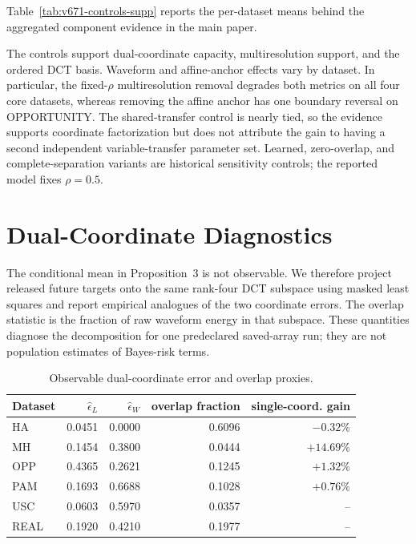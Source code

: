 \documentclass[letterpaper,10pt]{article}
\begin{document}
Table~\ref{tab:v671-controls-supp} reports the per-dataset means behind the
aggregated component evidence in the main paper.

The controls support dual-coordinate capacity, multiresolution support, and
the ordered DCT basis. Waveform and affine-anchor effects vary by dataset. In
particular, the fixed-$\rho$ multiresolution removal
degrades both metrics on all four core datasets, whereas removing the affine
anchor has one boundary reversal on OPPORTUNITY. The shared-transfer control is nearly tied, so the evidence
supports coordinate factorization but does not attribute the gain to having a
second independent variable-transfer parameter set. Learned, zero-overlap, and
complete-separation variants are historical sensitivity controls; the reported
model fixes $\rho=0.5$.

\section{Dual-Coordinate Diagnostics}

The conditional mean in Proposition~3 is not observable. We therefore project
released future targets onto the same rank-four DCT subspace using masked least
squares and report empirical analogues of the two coordinate errors. The
overlap statistic is the fraction of raw waveform energy in that subspace.
These quantities diagnose the decomposition for one predeclared saved-array
run; they are not population estimates of Bayes-risk terms.

\begin{table}[H]
\centering
\setlength{\tabcolsep}{5pt}
\caption{Observable dual-coordinate error and overlap proxies.}
\label{tab:v671-coordinate-diagnostic}
\begin{tabular}{@{}lrrrr@{}}
\toprule
Dataset & $\widehat\epsilon_L$ & $\widehat\epsilon_W$ & overlap fraction & single-coord. gain \\
\midrule
HA & 0.0451 & 0.0000 & 0.6096 & $-0.32\%$ \\
MH & 0.1454 & 0.3800 & 0.0444 & $+14.69\%$ \\
OPP & 0.4365 & 0.2621 & 0.1245 & $+1.32\%$ \\
PAM & 0.1693 & 0.6688 & 0.1028 & $+0.76\%$ \\
USC & 0.0603 & 0.5970 & 0.0357 & -- \\
REAL & 0.1920 & 0.4210 & 0.1977 & -- \\
\bottomrule
\end{tabular}
\end{table}
\end{document}
